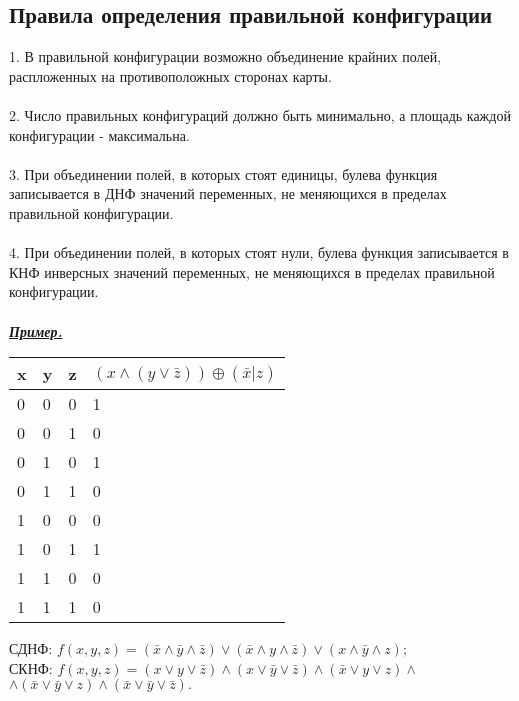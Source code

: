 \documentclass{article}
\begin{document}
	\begin{center}
	\subsection*{Правила определения правильной конфигурации}
	\end{center}
	1. В правильной конфигурации возможно объединение крайних полей, распложенных на противоположных
	сторонах карты.
	\\\\
	2. Число правильных конфигураций должно быть минимально, а площадь каждой конфигурации - максимальна.
	\\\\
	3. При объединении полей, в которых стоят единицы, булева функция записывается в ДНФ значений переменных,
	не меняющихся в пределах правильной конфигурации.
	\\\\
	4. При объединении полей, в которых стоят нули, булева функция записывается в КНФ инверсных значений переменных,
	не меняющихся в пределах правильной конфигурации.
	\\\\
	\textit{\textbf{\underline{Пример.}}}
	
	\begin{table}[ht]
		\centering
		\begin{tabular}{|l|l|l|l|}
			\hline
			x & y & z & $(x \wedge (y \vee \bar{z})) \oplus (\bar{x}|z)$ \\ \hline
			0 & 0 & 0 & 1                                                \\ \hline
			0 & 0 & 1 & 0                                                \\ \hline
			0 & 1 & 0 & 1                                                \\ \hline
			0 & 1 & 1 & 0                                                \\ \hline
			1 & 0 & 0 & 0                                                \\ \hline
			1 & 0 & 1 & 1                                                \\ \hline
			1 & 1 & 0 & 0                                                \\ \hline
			1 & 1 & 1 & 0                                                \\ \hline
		\end{tabular}
	\end{table}
	СДНФ: $f(x, y, z) = (\bar{x} \wedge \bar{y} \wedge \bar{z}) \vee (\bar{x} \wedge y \wedge \bar{z}) \vee (x \wedge \bar{y} \wedge z);$\\
	СКНФ: $f(x, y, z) = (x \vee y \vee \bar{z}) \wedge (x \vee \bar{y} \vee \bar{z}) \wedge (\bar{x} \vee y \vee z) \wedge$\\
	$\wedge (\bar{x} \vee \bar{y} \vee z) \wedge (\bar{x} \vee \bar{y} \vee \bar{z}).$
	
\end{document}
